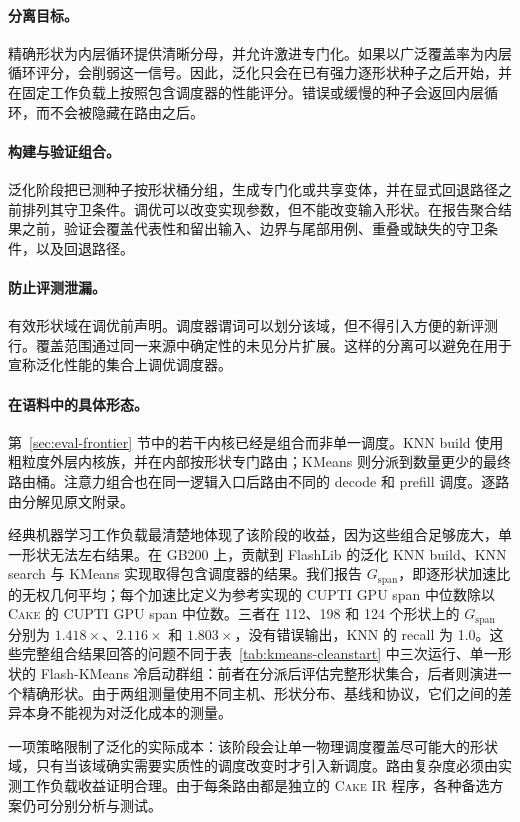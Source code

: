 \documentclass[10pt]{article}
\newcommand{\cake}{\textsc{Cake}}
\newcommand{\cakeir}{\textsc{Cake IR}}
\begin{document}
\paragraph{分离目标。}
精确形状为内层循环提供清晰分母，并允许激进专门化。如果以广泛覆盖率为内层循环评分，会削弱这一信号。因此，泛化只会在已有强力逐形状种子之后开始，并在固定工作负载上按照包含调度器的性能评分。错误或缓慢的种子会返回内层循环，而不会被隐藏在路由之后。

\paragraph{构建与验证组合。}
泛化阶段把已测种子按形状桶分组，生成专门化或共享变体，并在显式回退路径之前排列其守卫条件。调优可以改变实现参数，但不能改变输入形状。在报告聚合结果之前，验证会覆盖代表性和留出输入、边界与尾部用例、重叠或缺失的守卫条件，以及回退路径。

\paragraph{防止评测泄漏。}
有效形状域在调优前声明。调度器谓词可以划分该域，但不得引入方便的新评测行。覆盖范围通过同一来源中确定性的未见分片扩展。这样的分离可以避免在用于宣称泛化性能的集合上调优调度器。

\paragraph{在语料中的具体形态。}
第~\ref{sec:eval-frontier} 节中的若干内核已经是组合而非单一调度。KNN build 使用粗粒度外层内核族，并在内部按形状专门路由；KMeans 则分派到数量更少的最终路由桶。注意力组合也在同一逻辑入口后路由不同的 decode 和 prefill 调度。逐路由分解见原文附录。

经典机器学习工作负载最清楚地体现了该阶段的收益，因为这些组合足够庞大，单一形状无法左右结果。在 GB200 上，贡献到 FlashLib 的泛化 KNN build、KNN search 与 KMeans 实现取得包含调度器的结果。我们报告 $G_{\mathrm{span}}$，即逐形状加速比的无权几何平均；每个加速比定义为参考实现的 CUPTI GPU span 中位数除以 \cake{} 的 CUPTI GPU span 中位数。三者在 112、198 和 124 个形状上的 $G_{\mathrm{span}}$ 分别为 $1.418\times$、$2.116\times$ 和 $1.803\times$，没有错误输出，KNN 的 recall 为 1.0。这些完整组合结果回答的问题不同于表~\ref{tab:kmeans-cleanstart} 中三次运行、单一形状的 Flash-KMeans 冷启动群组：前者在分派后评估完整形状集合，后者则演进一个精确形状。由于两组测量使用不同主机、形状分布、基线和协议，它们之间的差异本身不能视为对泛化成本的测量。

一项策略限制了泛化的实际成本：该阶段会让单一物理调度覆盖尽可能大的形状域，只有当该域确实需要实质性的调度改变时才引入新调度。路由复杂度必须由实测工作负载收益证明合理。由于每条路由都是独立的 \cakeir{} 程序，各种备选方案仍可分别分析与测试。
\end{document}
